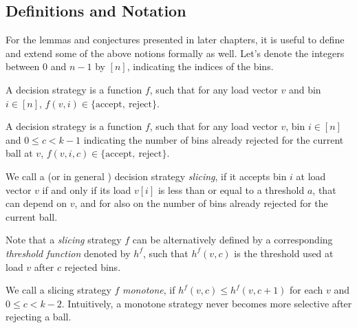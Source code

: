 \subsection{Definitions and Notation} \label{notation}

For the lemmas and conjectures presented in later chapters, it is useful to define and extend some of the above notions formally as well. Let's denote the integers between $0$ and $n-1$ by $[n]$, indicating the indices of the bins.


\begin{definition} 
A \TwoThinning decision strategy is a function $f$, such that for any load vector $v$ and bin $i\in[n]$, $f(v, i)\in\{\mathrm{accept},\ \mathrm{reject}\}$.
\end{definition}


\begin{definition} 
A \KThinning decision strategy is a function $f$, such that for any load vector $v$, bin $i\in[n]$ and $0\leq c<k-1$ indicating the number of bins already rejected for the current ball at $v$, $f(v, i, c)\in\{\mathrm{accept},\ \mathrm{reject}\}$.
\end{definition}


\begin{definition} 
We call a \TwoThinning (or in general \KThinning) decision strategy \textit{slicing}, if it accepts bin $i$ at load vector $v$ if and only if its load $v[i]$ is less than or equal to a threshold $a$, that can depend on $v$, and for \KThinning also on the number of bins already rejected for the current ball.
\end{definition}


\begin{definition} 
Note that a \KThinning \textit{slicing} strategy $f$ can be alternatively defined by a corresponding \textit{threshold function} denoted by $h^f$, such that $h^f(v,c)$ is the threshold used at load $v$ after $c$ rejected bins.
\end{definition}



\begin{definition} 
We call a \KThinning slicing strategy $f$ \textit{monotone}, if $h^f(v,c)\leq h^f(v,c+1)$ for each $v$ and $0\leq c<k-2$. Intuitively, a monotone strategy never becomes more selective after rejecting a ball.
\end{definition}


